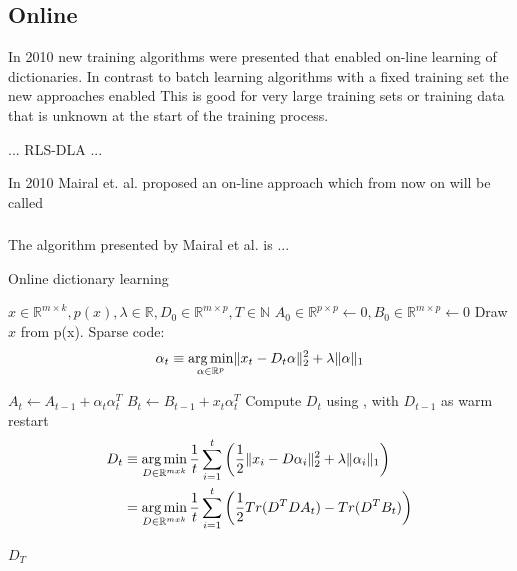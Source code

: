 \subsection{Online}
In 2010 new training algorithms were presented that enabled on-line learning of
dictionaries. In contrast to batch learning algorithms with a fixed training set
the new approaches enabled This is good for very large training sets or training
data that is unknown at the start of the training process.

... RLS-DLA\cite{Engan2010} ...


In 2010 Mairal et. al.\cite{Mairal2010} proposed an on-line approach which from
now on will be called \trainDL

\subsubsection{\trainDL}
\label{sec:mairal}
The algorithm presented by Mairal et al.\cite{Mairal2010} is ...

\begin{algorithm}
\caption{Online dictionary learning\cite{Mairal2010}}
\label{alg:trainDL}
\begin{algorithmic}[1]
\REQUIRE $x \in \mathbb{R}^{m \times k},  p \left( x \right), \lambda \in \mathbb{R}, D_0 \in \mathbb{R}^{m \times p}, T \in \mathbb{N}$
\STATE $A_0 \in \mathbb{R}^{p \times p} \gets  0, B_0 \in \mathbb{R}^{m \times p}\gets 0$
\STATE Draw $x$ from p(x).
\STATE Sparse code:
\begin{align*} 
\alpha_t \equiv \operatorname*{arg\,min}_{\alpha\in\mathbb{R}^{p}}  \lVert x_t - D_t\alpha \rVert^{2}_{2}  +  \lambda \lVert \alpha \rVert_{1}
\end{align*}

\STATE $A_t \gets A_{t-1} + \alpha_t\alpha_t^T$
\STATE $B_t \gets B_{t-1} + x_t\alpha_t^T$
\STATE Compute $D_t$ using , with $D_{t-1}$ as warm restart 
\begin{equation}
\begin{split}
D_t  & \equiv \operatorname*{arg\,min}_{D \in \mathbb{R}^{m x k}}  \frac{1}{t} \sum_{i=1}^t
\left( \frac{1}{2} \lVert x_i - D\alpha_i \rVert^{2}_{2}  +  \lambda \lVert
\alpha_i \rVert_{1} \right) \\
& = \operatorname*{arg\,min}_{D \in \mathbb{R}^{m x k}}  \frac{1}{t} \sum_{i=1}^t
\left( \frac{1}{2} Tr(D^TDA_t) - Tr(D^TB_t)\right) \label{eq:update}
\end{split}
\end{equation}
 
\ENDFOR
\RETURN $D_T$
\end{algorithmic}
\end{algorithm}


